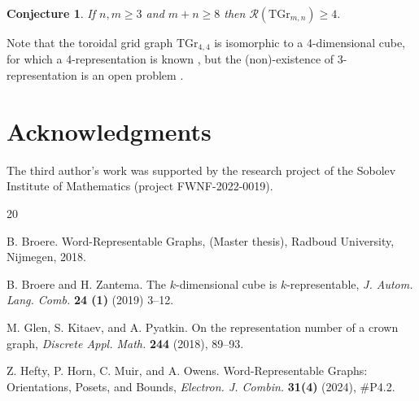 \documentclass[11pt]{article}
\newtheorem{conjecture}{Conjecture}
\begin{document}
\begin{conjecture}
If $n,m\ge 3$ and $m+n\ge 8$ then  $\mathcal{R}(\mbox{TGr}_{m,n})\ge 4.$
\end{conjecture}

Note that the toroidal grid graph  $\mbox{TGr}_{4,4}$ is isomorphic to a 4-dimensional cube, for which a 4-representation is known \cite{BroZan19},  but the (non)-existence of 3-representation is an open problem \cite{HHMO24}.

\section*{Acknowledgments} The third author's work was supported by the research project of the Sobolev Institute of Mathematics (project FWNF-2022-0019).

\begin{thebibliography}{20}


 B. Broere. Word-Representable Graphs, (Master thesis), Radboud University, Nijmegen, 2018.

 B. Broere and H. Zantema. The $k$-dimensional cube is $k$-representable, {\em J. Autom. Lang. Comb.} {\bf 24 (1)} (2019) 3--12.



	
 M. Glen, S. Kitaev, and A. Pyatkin. On the representation number of a crown graph, {\em Discrete Appl. Math.} {\bf 244} (2018), 89--93. 


 Z. Hefty, P. Horn, C. Muir, and A. Owens. Word-Representable Graphs: Orientations, Posets, and Bounds, {\em Electron. J. Combin.} {\bf 31(4)} (2024), \#P4.2.


\end{thebibliography}
\end{document}
